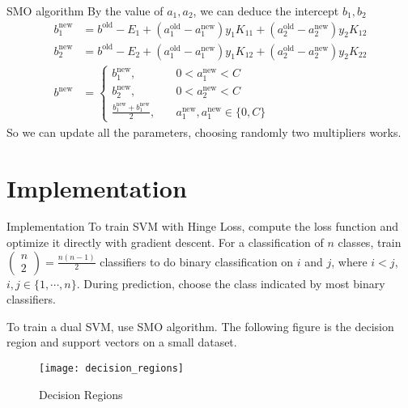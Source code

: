\documentclass[10pt,aspectratio=43,mathserif]{beamer}
\begin{document}
\begin{frame}{SMO algorithm}
By the value of $a_1, a_2$, we can deduce the intercept $b_1, b_2$
\begin{align*}
    b_1^{\mathrm{new}} &= b^{\mathrm{old}} - E_1 + (a_1^{\mathrm{old}}-a_1^{\mathrm{new}})y_1 K_{11} + (a_2^{\mathrm{old}}-a_2^{\mathrm{new}})y_2 K_{12} \\
    b_2^{\mathrm{new}} &= b^{\mathrm{old}} - E_2 + (a_1^{\mathrm{old}}-a_1^{\mathrm{new}})y_1 K_{12} + (a_2^{\mathrm{old}}-a_2^{\mathrm{new}})y_2 K_{22} \\
    b^{\mathrm{new}}&= 
    \begin{cases}
        b_1^{\mathrm{new}}, \quad &0<a_1^{\mathrm{new}}<C \\
        b_2^{\mathrm{new}}, \quad &0<a_2^{\mathrm{new}}<C \\
        \frac{b_1^{\mathrm{new}}+b_1^{\mathrm{new}}}{2}, \quad &a_1^{\mathrm{new}},a_1^{\mathrm{new}}\in \{0,C\} 
    \end{cases}
\end{align*}
So we can update all the parameters, choosing randomly two multipliers works.
\end{frame}
\section{Implementation}
\begin{frame}{Implementation}
To train SVM with Hinge Loss, compute the loss function and optimize it directly with gradient descent. For a classification of $n$ classes, train $\begin{pmatrix}n\\2\end{pmatrix}=\frac{n(n-1)}{2}$ classifiers to do binary classification on $i$ and $j$, where $i<j$, $i,j\in\{1,\cdots,n\}$. During prediction, choose the class indicated by most binary classifiers.

To train a dual SVM, use SMO algorithm. The following figure is the decision region and support vectors on a small dataset.

\begin{figure}[H]
\centering
\texttt{[image: decision\_regions]}
\caption{Decision Regions}
\end{figure}

\end{frame}
\end{document}
